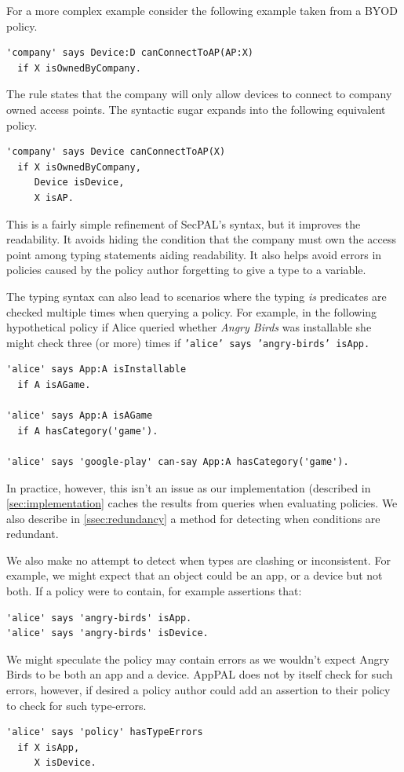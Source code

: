 \documentclass[thesis.tex]{subfiles}
\begin{document}
For a more complex example consider the following example taken from a
BYOD policy.
\begin{lstlisting}
'company' says Device:D canConnectToAP(AP:X)
  if X isOwnedByCompany.
\end{lstlisting}

The rule states that the company will only allow devices to connect to
company owned access points.  The syntactic sugar expands into the
following equivalent policy.

\begin{lstlisting}
'company' says Device canConnectToAP(X)
  if X isOwnedByCompany,
     Device isDevice,
     X isAP.
\end{lstlisting}

This is a fairly simple refinement of SecPAL's syntax, but it improves the
readability. It avoids hiding the condition that the company must own the access
point among typing statements aiding readability. It also helps avoid errors
in policies caused by the policy author forgetting to give a type to a variable.

The typing syntax can also lead to scenarios where the typing \emph{is} predicates are checked multiple times when querying a policy.  For example, in the following hypothetical policy if Alice queried whether \emph{Angry Birds} was installable she might check three (or more) times if \texttt{'alice' says 'angry-birds' isApp.}
\begin{lstlisting}
'alice' says App:A isInstallable
  if A isAGame.

'alice' says App:A isAGame
  if A hasCategory('game').

'alice' says 'google-play' can-say App:A hasCategory('game').
\end{lstlisting}
In practice, however, this isn't an issue as our
implementation (described in \autoref{sec:implementation} caches the
results from queries when evaluating policies.  We also describe in
\autoref{ssec:redundancy} a method for detecting when conditions are
redundant.

We also make no attempt to detect when types are clashing or
inconsistent.  For example, we might expect that an object could be an
app, or a device but not both.  If a policy were to contain, for
example assertions that:
\begin{lstlisting}
'alice' says 'angry-birds' isApp.
'alice' says 'angry-birds' isDevice.
\end{lstlisting}
We might speculate the policy may contain errors as we wouldn't expect
Angry Birds to be both an app and a device.  AppPAL does not by itself
check for such errors, however, if desired a policy author could add
an assertion to their policy to check for such type-errors.
\begin{lstlisting}
'alice' says 'policy' hasTypeErrors
  if X isApp,
     X isDevice.
\end{lstlisting}
\end{document}
